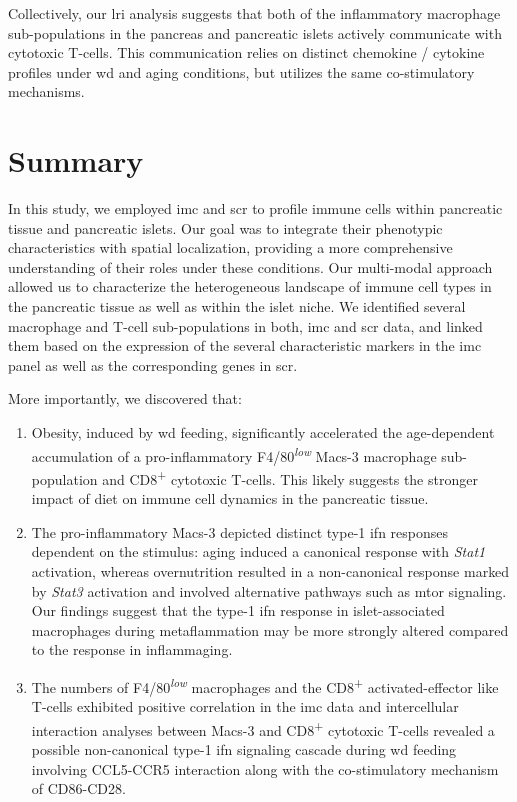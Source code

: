 \par Collectively, our \gls{lri} analysis suggests that both of the inflammatory macrophage sub-populations in the pancreas and pancreatic islets actively communicate with cytotoxic T-cells. This communication relies on distinct chemokine / cytokine profiles under \gls{wd} and aging conditions, but utilizes the same co-stimulatory mechanisms. 

\clearpage

\section[Summary]{Summary}
\label{sec:chp2_summary}
\vspace{-5pt}
\par In this study, we employed \gls{imc} and \gls{scr} to profile immune cells within pancreatic tissue and pancreatic islets. Our goal was to integrate their phenotypic characteristics with spatial localization, providing a more comprehensive understanding of their roles under these conditions. Our multi-modal approach allowed us to characterize the heterogeneous landscape of immune cell types in the pancreatic tissue as well as within the islet niche. We identified several macrophage and T-cell sub-populations in both, \gls{imc} and \gls{scr} data, and linked them based on the expression of the several characteristic markers in the \gls{imc} panel as well as the corresponding genes in \gls{scr}.\\

\par More importantly, we discovered that:

\begin{enumerate}
    \item Obesity, induced by \gls{wd} feeding, significantly accelerated the age-dependent accumulation of a pro-inflammatory F4/80\textsuperscript{\textit{low}} Macs-3 macrophage sub-population and CD8\textsuperscript{+} cytotoxic T-cells. This likely suggests the stronger impact of diet on immune cell dynamics in the pancreatic tissue.
    \item The pro-inflammatory Macs-3 depicted distinct type-1 \gls{ifn} responses dependent on the stimulus: aging induced a canonical response with \textit{Stat1} activation, whereas overnutrition resulted in a non-canonical response marked by \textit{Stat3} activation and involved alternative pathways such as \gls{mtor} signaling. Our findings suggest that the type-1 \gls{ifn} response in islet-associated macrophages during metaflammation may be more strongly altered compared to the response in inflammaging.
    \item The numbers of F4/80\textsuperscript{\textit{low}} macrophages and the CD8\textsuperscript{+} activated-effector like T-cells exhibited positive correlation in the \gls{imc} data and intercellular interaction analyses between Macs-3 and CD8\textsuperscript{+} cytotoxic T-cells revealed a possible non-canonical type-1 \gls{ifn} signaling cascade during \gls{wd} feeding involving CCL5-CCR5 interaction along with the co-stimulatory mechanism of CD86-CD28.
\end{enumerate}

